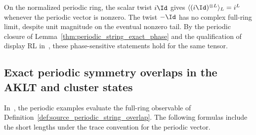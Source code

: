 \begin{example}
    On the normalized periodic ring, the scalar twist $i\Id$ gives
    $\langle(i\Id)^{\otimes L}\rangle_L=i^L$ whenever the periodic vector
    is nonzero. The twist $-\Id$ has no complex full-ring limit, despite
    unit magnitude on the eventual nonzero tail. By the periodic closure of
    Lemma~\ref{thm:periodic_string_exact_phase} and the qualification of
    display RL in~\cite{gap:pgwsvc08_string_order_virtual_boundary}, these
    phase-sensitive statements hold for the same tensor.
\end{example}
\subsection{Exact periodic symmetry overlaps in the AKLT and cluster states}

In~\cite[lines~392--411]{PerezGarcia2008StringOrder}, the periodic examples
evaluate the full-ring observable of
Definition~\ref{def:source_periodic_string_overlap}. The following formulas
include the short lengths under the trace convention for the periodic vector.

